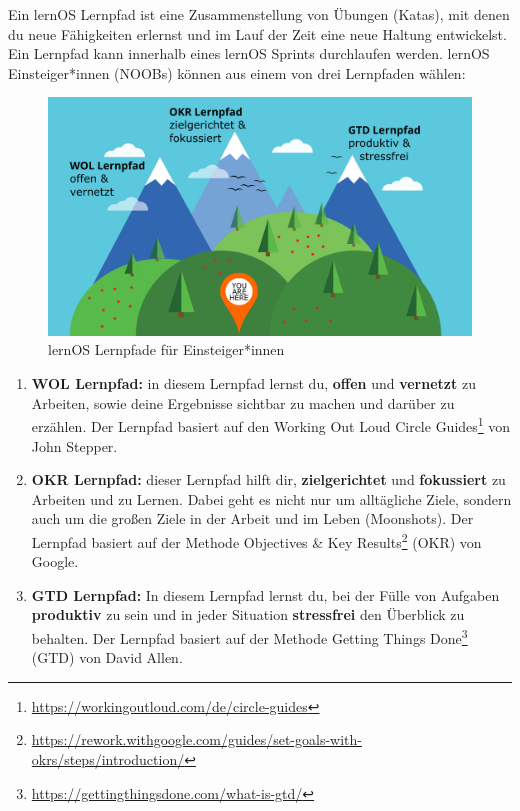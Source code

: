 \documentclass[
  ngerman,
  paper=a4,
,captions=tableheading
]{scrartcl}
\DeclareRobustCommand{\href}[2]{#2\footnote{\url{#1}}}
\providecommand{\tightlist}{%
  \setlength{\itemsep}{0pt}\setlength{\parskip}{0pt}}
\begin{document}
Ein lernOS Lernpfad ist eine Zusammenstellung von Übungen (Katas), mit
denen du neue Fähigkeiten erlernst und im Lauf der Zeit eine neue
Haltung entwickelst. Ein Lernpfad kann innerhalb eines lernOS Sprints
durchlaufen werden. lernOS Einsteiger*innen (NOOBs) können aus einem von
drei Lernpfaden wählen:

\begin{figure}
\centering
\includegraphics{./tex2pdf.-af94b87e0fdb9aa6/c587d0e577abadd8b4876e8bdf99260f63e71cf7.png}
\caption{lernOS Lernpfade für Einsteiger*innen}
\end{figure}

\begin{enumerate}
\def\labelenumi{\arabic{enumi}.}
\tightlist
\item
  \textbf{WOL Lernpfad:} in diesem Lernpfad lernst du, \textbf{offen}
  und \textbf{vernetzt} zu Arbeiten, sowie deine Ergebnisse sichtbar zu
  machen und darüber zu erzählen. Der Lernpfad basiert auf den
  \href{https://workingoutloud.com/de/circle-guides}{Working Out Loud
  Circle Guides} von John Stepper.
\item
  \textbf{OKR Lernpfad:} dieser Lernpfad hilft dir,
  \textbf{zielgerichtet} und \textbf{fokussiert} zu Arbeiten und zu
  Lernen. Dabei geht es nicht nur um alltägliche Ziele, sondern auch um
  die großen Ziele in der Arbeit und im Leben (Moonshots). Der Lernpfad
  basiert auf der Methode
  \href{https://rework.withgoogle.com/guides/set-goals-with-okrs/steps/introduction/}{Objectives
  \& Key Results} (OKR) von Google.
\item
  \textbf{GTD Lernpfad:} In diesem Lernpfad lernst du, bei der Fülle von
  Aufgaben \textbf{produktiv} zu sein und in jeder Situation
  \textbf{stressfrei} den Überblick zu behalten. Der Lernpfad basiert
  auf der Methode
  \href{https://gettingthingsdone.com/what-is-gtd/}{Getting Things Done}
  (GTD) von David Allen.
\end{enumerate}
\end{document}
